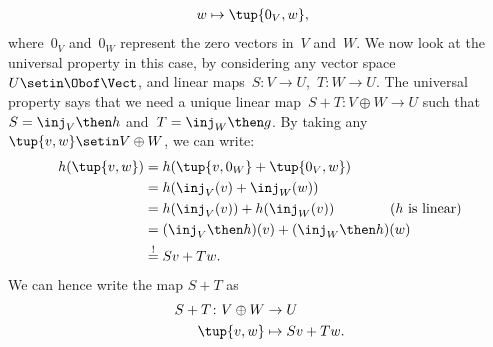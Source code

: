 {\begin{example}
\begin{equation}
\begin{aligned}
                w               & \mapsto \tup{0_V,w},
            \end{aligned}
        \end{equation}
        where~$0_V$ and~$0_W$ represent the zero vectors in~$V$ and~$W$.
        We now look at the universal property in this case, by considering any vector space $U\setin \Obof\Vect$, and linear maps~$S\colon V\to U$,~$T\colon W\to U$.
        The universal property says that we need a unique linear map~$S+T\colon V\oplus W \to U$ such that~$S=\inj_V\then h$ and~$T=\inj_W\then g$.
        By taking any~$\tup{v,w}\setin V\oplus W$, we can write:
        \begin{equation}
            \begin{aligned}
                h(\tup{v,w}) & =h(\tup{v,0_W}+\tup{0_V,w}) \\
                             & =h(\inj_V(v)+\inj_W(w)) \\
                             & =h(\inj_V(v))+h(\inj_W(v)) \qquad \qquad (h \text{ is linear}) \\
                             & =(\inj_V\then h)(v)+(\inj_W\then h)(w) \\
                             & \overset{!
                }{=}
                Sv+Tw.
            \end{aligned}
        \end{equation}
        We can hence write the map $S+T$ as
        \begin{equation}
            \begin{aligned}
                S+T\colon V\oplus W & \to U \\
                \tup{v,w}           & \mapsto Sv+Tw.
            \end{aligned}
        \end{equation}
    \end{example}
}
